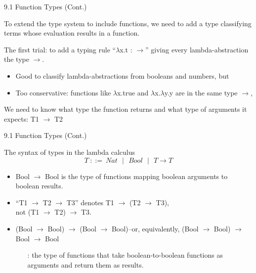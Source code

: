\documentclass[table]{beamer}
\begin{document}
\begin{frame}[t]{9.1 Function Types (Cont.)} \vspace{10pt}

To extend the type system to include functions, we need to add a type classifying terms whose evaluation results in a function.

\vspace{10pt}

The first trial: to add a typing rule ``$\lambda$x.t : $\rightarrow$'' giving every lambda-abstraction the type $\rightarrow$. 
\begin{itemize}
\item Good to classify lambda-abstractions from booleans and numbers, but

\item Too conservative: functions like $\lambda$x.true and $\lambda$x.$\lambda$y.y are in the same type $\rightarrow$, 

\end{itemize}

\vspace{10pt}

We need to know what type the function returns and what type of arguments it expects: T1 $\rightarrow$ T2

\end{frame}

\begin{frame}[t]{9.1 Function Types (Cont.)} \vspace{10pt}

The syntax of types in the lambda calculus
\[
T \ ::= \ Nat \ \ \ | \ \ \ Bool \ \ \ | \ \ \ T \rightarrow T 
\]

\vspace{10pt}

\begin{itemize}
\item
Bool $\rightarrow$ Bool is the type of functions mapping boolean arguments to boolean results.

\item
``T1 $\rightarrow$ T2 $\rightarrow$ T3'' denotes T1 $\rightarrow$ (T2 $\rightarrow$ T3), \\ not (T1 $\rightarrow$ T2) $\rightarrow$ T3.


\item
(Bool $\rightarrow$ Bool) $\rightarrow$ (Bool $\rightarrow$ Bool)--or, equivalently, (Bool $\rightarrow$ Bool) $\rightarrow$ Bool $\rightarrow$ Bool

\begin{itemize}
\item[:] the type of functions that take boolean-to-boolean functions as arguments and return them as results.
\end{itemize}
\end{itemize}

\end{frame}
\end{document}
